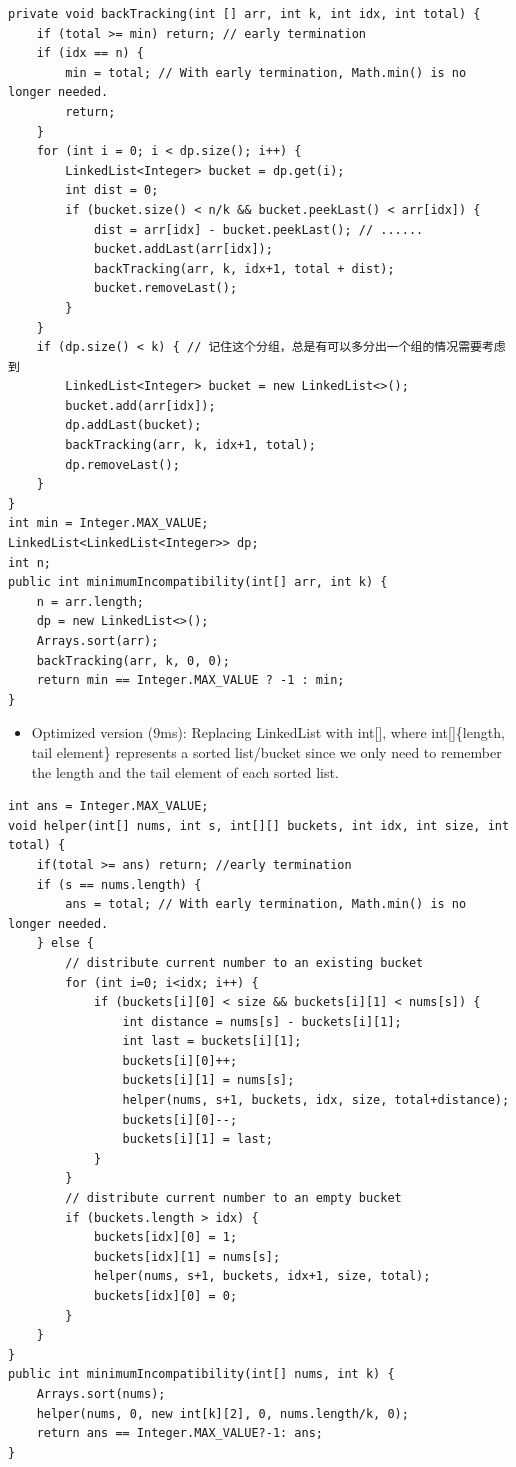 \documentclass[9pt, b5paaper]{book}
\begin{document}
\begin{verbatim}
private void backTracking(int [] arr, int k, int idx, int total) {
    if (total >= min) return; // early termination
    if (idx == n) {
        min = total; // With early termination, Math.min() is no longer needed.
        return;
    }
    for (int i = 0; i < dp.size(); i++) {
        LinkedList<Integer> bucket = dp.get(i);
        int dist = 0;
        if (bucket.size() < n/k && bucket.peekLast() < arr[idx]) {
            dist = arr[idx] - bucket.peekLast(); // ......
            bucket.addLast(arr[idx]);
            backTracking(arr, k, idx+1, total + dist);
            bucket.removeLast();
        }
    }
    if (dp.size() < k) { // 记住这个分组，总是有可以多分出一个组的情况需要考虑到
        LinkedList<Integer> bucket = new LinkedList<>();
        bucket.add(arr[idx]);
        dp.addLast(bucket);
        backTracking(arr, k, idx+1, total);
        dp.removeLast();
    }
}
int min = Integer.MAX_VALUE;
LinkedList<LinkedList<Integer>> dp;
int n;
public int minimumIncompatibility(int[] arr, int k) {
    n = arr.length;
    dp = new LinkedList<>();
    Arrays.sort(arr);
    backTracking(arr, k, 0, 0);
    return min == Integer.MAX_VALUE ? -1 : min;
}
\end{verbatim}
\begin{itemize}
\item Optimized version (9ms): Replacing LinkedList with int[], where int[]\{length, tail element\} represents a sorted list/bucket since we only need to remember the length and the tail element of each sorted list.
\end{itemize}
\begin{verbatim}
int ans = Integer.MAX_VALUE;
void helper(int[] nums, int s, int[][] buckets, int idx, int size, int total) {
    if(total >= ans) return; //early termination
    if (s == nums.length) {
        ans = total; // With early termination, Math.min() is no longer needed.
    } else {
        // distribute current number to an existing bucket
        for (int i=0; i<idx; i++) {
            if (buckets[i][0] < size && buckets[i][1] < nums[s]) {
                int distance = nums[s] - buckets[i][1];
                int last = buckets[i][1];
                buckets[i][0]++;
                buckets[i][1] = nums[s];
                helper(nums, s+1, buckets, idx, size, total+distance);
                buckets[i][0]--;
                buckets[i][1] = last;
            }
        }
        // distribute current number to an empty bucket
        if (buckets.length > idx) {
            buckets[idx][0] = 1;
            buckets[idx][1] = nums[s];
            helper(nums, s+1, buckets, idx+1, size, total);
            buckets[idx][0] = 0;
        }
    }
}
public int minimumIncompatibility(int[] nums, int k) {
    Arrays.sort(nums);
    helper(nums, 0, new int[k][2], 0, nums.length/k, 0);
    return ans == Integer.MAX_VALUE?-1: ans;
}
\end{verbatim}
\end{document}
